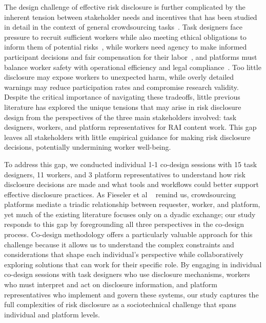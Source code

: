 The design challenge of effective risk disclosure is further complicated by the inherent tension between stakeholder needs and incentives that has been studied in detail in the context of general crowdsourcing tasks~\cite{finnerty2013keep, gaikwad2016boomerang, salehi2015we, irani2013turkopticon, salehi2018ink}. Task designers face pressure to recruit sufficient workers while also meeting ethical obligations to inform them of potential risks~\cite{qian2025locating, finnerty2013keep, kittur2008crowdsourcing, zheng2011task, bragg2018sprout}, while workers need agency to make informed participant decisions and fair compensation for their labor~\cite{irani2013turkopticon, salehi2018ink, martin2014being, silberman2018responsible, toxtli2021quantifying, schlicher2021flexible}, and platforms must balance worker safety with operational efficiency and legal compliance~\cite{gaikwad2016boomerang, xu2017incentivizing, xia2020privacy, allen2018design}. Too little disclosure may expose workers to unexpected harm, while overly detailed warnings may reduce participation rates and compromise research validity. Despite the critical importance of navigating these tradeoffs, little previous literature has explored the unique tensions that may arise in risk disclosure design from the perspectives of the three main stakeholders involved: task designers, workers, and platform representatives for RAI content work. This gap leaves all stakeholders with little empirical guidance for making risk disclosure decisions, potentially undermining worker well-being. 



To address this gap, we conducted individual 1-1 co-design sessions with 15 task designers, 11 workers, and 3 platform representatives to understand how risk disclosure decisions are made and what tools and workflows could better support effective disclosure practices. As Fieseler et al ~\cite{fieseler_unfairness_2019} remind us, crowdsourcing platforms mediate a triadic relationship between requester, worker, and platform, yet much of the existing literature focuses only on a dyadic exchange; our study responds to this gap by foregrounding all three perspectives in the co-design process. Co-design methodology offers a particularly valuable approach for this challenge because it allows us to understand the complex constraints and considerations that shape each individual's perspective while collaboratively exploring solutions that can work for their specific role. By engaging in individual co-design sessions with task designers who use disclosure mechanisms, workers who must interpret and act on disclosure information, and platform representatives who implement and govern these systems, our study captures the full complexities of risk disclosure as a sociotechnical challenge that spans individual and platform levels. 

